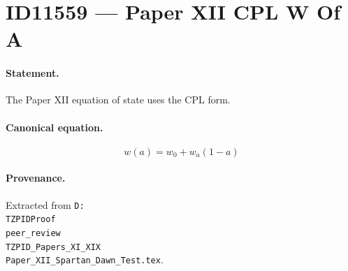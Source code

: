 \section*{ID11559 --- Paper XII CPL W Of A}

\paragraph{Statement.}
The Paper XII equation of state uses the CPL form.

\paragraph{Canonical equation.}
\[
w(a)=w_0+w_a(1-a)
\]

\paragraph{Provenance.}
Extracted from \texttt{D:\\TZPIDProof\\peer\_review\\TZPID\_Papers\_XI\_XIX\\Paper\_XII\_Spartan\_Dawn\_Test.tex}.
